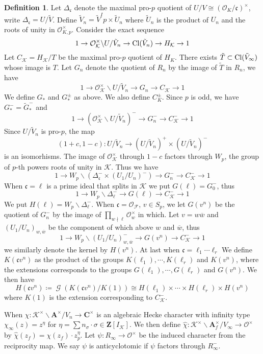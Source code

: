 \documentclass[leqno]{amsart}
\theoremstyle{definition}
\newtheorem{defn}[thm]{Definition}
\theoremstyle{remark}
\newcommand{\oo}{\mathcal{O}}
\newcommand{\Z}{{\mathbf{Z}}}
\newcommand{\C}{\mathbf C}
\newcommand{\A}{\mathbf A}
\DeclareMathOperator{\Gal}{\mathcal{G}}
\newcommand{\fc}{\mathfrak{c}}
\newcommand{\F}{{\mathcal{F}}} %
\newcommand{\K}{{\mathcal{K}}} %
\newcommand{\bw}{\overline{w}}
\begin{document}
\begin{defn}
Let $\Delta_\fc$ denote
the maximal pro-$p$ quotient of 
$U/V\cong (\oo_K/\fc)^\times$,
write  $\Delta_\fc=U/\tilde{V}$.
Define $\tilde{V}_n=\tilde{V}^Ip\times \tilde{U}_n$
where $\tilde{U}_n$ is the product of $U_n$
and the roots of unity in  $\oo_{K,p}^\times$.
Consider the exact sequence
\[
	1\to \oo_\K^\times\backslash U/\tilde{V}_n
	\to \textnormal{Cl}(\tilde{V}_n)\to H_\K\to 1
\]
Let $C_\K=H_\K/T$ be the maximal pro-$p$ quotient
of $H_K$. There exists  
$ \tilde{T}\subset \textnormal{Cl}(\tilde{V}_\infty)$
whose image is $T$.
Let $G_n$ denote the quotient of  $R_n$
by the image of  $ \tilde{T}$ in $R_n$, we have
\[
	1\to \oo_\K^\times\backslash U/\tilde{V}_n
	\to G_n\to C_\K\to 1
\]
We define $G_*$ and  $G_*^{\pm}$ as above.
We also define $C_K^{\pm}$.
Since $p$ is odd, we have
$G_*^{-}=\tilde{G}_*^-$ and 
\[
	1\to (\oo_\K^\times\backslash U/\tilde{V}_n)^-
	\to G_n^-\to C_\K^-\to 1
\]
Since $U/\tilde{V}_n$ is pro-$p$, the map
\[
	 (1+c,1-c)\colon 
	 U/\tilde{V}_n\to 
	 (U/\tilde{V}_n)^+\times
	 (U/\tilde{V}_n)^-
\]
is an isomorhisms.
The image of $\oo_\K^\times$ through  $1-c$
factors through  $W_p$,
the group of $p$-th powers roots of unity in  $\K$.
Thus we have
\[
	1\to W_p\backslash (\Delta_\fc^-\times (U_1/U_n)^-)
	\to G_n^-\to C_\K^-\to 1
\]
When $\fc=\ell$ is a prime ideal that splits in  $\K$
we put  $G(\ell)=G_0^-$, thus
\[
	1\to W_p\backslash \Delta_\ell^-
	\to G(\ell)\to C_\K^-\to 1
\]
We put $H(\ell)=W_p\backslash \Delta_\ell^-$.
When  $\fc=\oo_\F$, $v\in S_p$,
we let $G(v^n)$ be the quotient 
of $G_n^-$ by the image of 
$\prod_{w\nmid \ell}\oo_w^\times$ in which.
Let $v=w\bw$ and 
$(U_1/U_n)_{w,\bw}$ be the component
of which above $w$ and  $\bw$, thus
\[
	1\to W_p\backslash (U_1/U_n)_{w,\bw}^-
	\to G(v^n)\to C_\K^-\to 1
\]
we similarly denote the kernel by $H(v^n)$.
At last
when  $\fc=\ell_1\cdots\ell_r$
We define $K(\fc v^n)$
as the product of the groups
$K(\ell_1),\cdots, K(\ell_r)$ and $K(v^n)$,
where the extensions corresponds
to the groups  $G(\ell_1),\cdots,G(\ell_r)$ and $G(v^n)$.
We then have 
\[
	H(\fc v^n)\coloneqq 
	\Gal(K(\fc v^n)/K(1))\cong 
	H(\ell_1)\times\cdots\times H(\ell_r)\times H(v^n)
\]
where $K(1)$ is the extension corresponding
to  $C_\K^-$.
\end{defn}


When $\chi\colon\K^\times\backslash\A^\times/V_n\to \C^\times$
is an algebraic Hecke character 
with infinity type  $\chi_\infty(z)=z^\eta$
for $\eta=\sum n_\sigma\cdot\sigma\in \Z[I_\K]$.
We then define 
$\hat{\chi}\colon \K^\times\backslash\A_f^\times/V_\infty
\to \oo^\times$ by 
$ \hat{\chi}(z_f)=\chi(z_f)\cdot z_p^\eta$.
Let $\psi\colon R_\infty\to \oo^\times$
be the induced character from the reciprocity map.
We say  $\psi$ is anticyclotomic if
$\psi$ factors through $R_\infty^-$.
\end{document}

